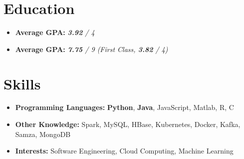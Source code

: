 \documentclass{resume}
\begin{document}



\section{Education}
\begin{itemize}[parsep=0.5ex]
  \item \textbf{Average GPA:} \textit{\textbf{3.92} / 4}
\end{itemize}
\begin{itemize}[parsep=0.5ex]
  \item \textbf{Average GPA:} \textit{\textbf{7.75} / 9 (First Class, \textbf{3.82} / 4)}
\end{itemize}

\section{Skills}
\begin{itemize}[parsep=0.5ex]
  \item \textbf{Programming Languages:} \textbf{Python}, \textbf{Java}, JavaScript, Matlab, R, C
  \item \textbf{Other Knowledge:} Spark, MySQL, HBase, Kubernetes, Docker, Kafka, Samza, MongoDB
  \item \textbf{Interests:} Software Engineering, Cloud Computing, Machine Learning
\end{itemize}
\end{document}
